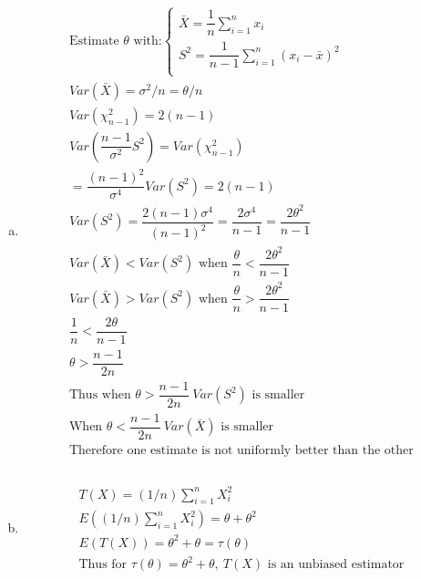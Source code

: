 \documentclass{article}
\newcommand{\sumn}{\sum_{i=1}^{n}}
\newcommand{\sumx}{\sum_{i=1}^{n}x_i}
\begin{document}
\begin{flushleft}
\begin{enumerate}[(a)]
	\item 
\begin{multline*}\\
\text{Estimate } \theta \text{ with:} \begin{cases}
\bar{X}=\dfrac{1}{n}\sumx\\
S^2=\dfrac{1}{n-1}\sumn(x_i-\bar{x})^2\\
\end{cases}\\
Var(\bar{X})=\sigma^2/n=\theta/n\\
Var(\chi^2_{n-1})=2(n-1)\\
Var\left(\dfrac{n-1}{\sigma^2}S^2\right)=Var(\chi^2_{n-1})\\
=\dfrac{(n-1)^2}{\sigma^4}Var(S^2)=2(n-1)\\
Var(S^2)=\dfrac{2(n-1)\sigma^4}{(n-1)^2}=\dfrac{2\sigma^4}{n-1}=\dfrac{2\theta^2}{n-1}\\
Var(\bar{X})<Var(S^2) \text{ when } \dfrac{\theta}{n}<\dfrac{2\theta^2}{n-1}\\
Var(\bar{X})>Var(S^2) \text{ when } \dfrac{\theta}{n}>\dfrac{2\theta^2}{n-1}\\
\dfrac{1}{n}<\dfrac{2\theta}{n-1}\\
\theta>\dfrac{n-1}{2n}\\
\text{Thus when } \theta > \dfrac{n-1}{2n} \ Var(S^2) \text{ is smaller}\\
\text{When } \theta < \dfrac{n-1}{2n} \ Var(\bar{X}) \text{ is smaller}\\
\text{Therefore one estimate is not uniformly better than the other}\\
\end{multline*}

	\item 
\begin{multline*}\\
T(X)=(1/n)\sumn X_i^2\\
E\left((1/n)\sumn X_i^2\right)=\theta+\theta^2\\
E(T(X))=\theta^2+\theta=\tau(\theta)\\
\text{Thus for } \tau(\theta)=\theta^2+\theta, \ T(X) \text{ is an unbiased estimator}\\ 
\end{multline*}


\end{enumerate}
\end{flushleft}
\end{document}
